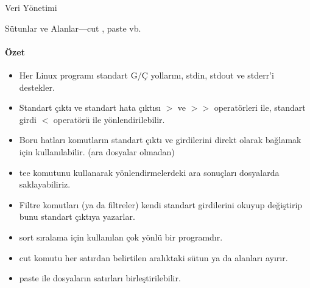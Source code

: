 \begin{section}{Veri Yönetimi}
\begin{subsection}{Sütunlar ve Alanlar—cut , paste vb.}
\paragraph{Özet}{
\begin{itemize}
\item Her Linux programı standart G/Ç yollarını, stdin, stdout ve stderr'i destekler. 
\item Standart çıktı ve standart hata çıktısı $>$ ve $>>$ operatörleri ile, standart girdi $<$ operatörü ile yönlendirilebilir.
\item Boru hatları komutların standart çıktı ve girdilerini direkt olarak bağlamak için kullanılabilir. (ara dosyalar olmadan)
\item tee komutunu kullanarak yönlendirmelerdeki ara sonuçları dosyalarda saklayabiliriz. 
\item Filtre komutları (ya da filtreler) kendi standart girdilerini okuyup değiştirip bunu standart çıktıya yazarlar. 
\item sort sıralama için kullanılan çok yönlü bir programdır. 
\item cut komutu her satırdan belirtilen aralıktaki sütun ya da alanları ayırır.
\item paste ile dosyaların satırları birleştirilebilir. 
\end{itemize}}
\end{subsection}
\end{section}